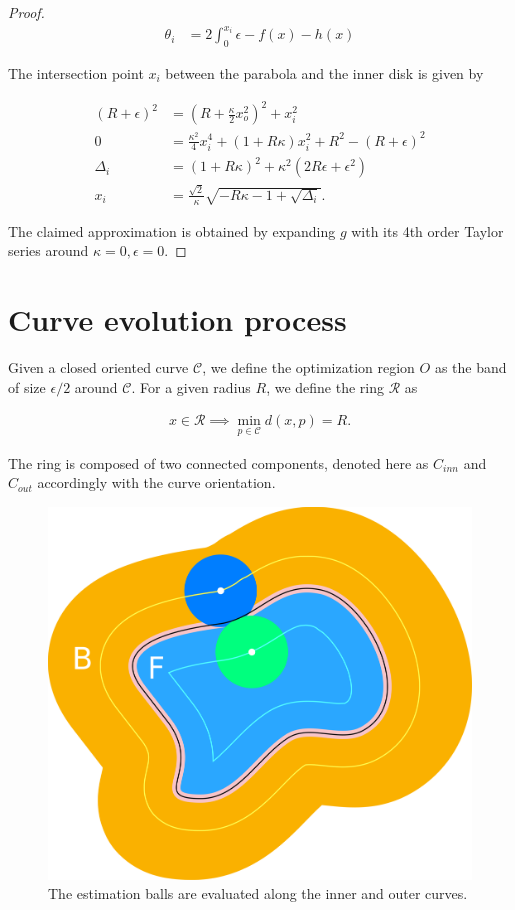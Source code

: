 \begin{proof}
\begin{align*}
	\theta_i &= 2\int_{0}^{x_i}{\epsilon - f(x) - h(x)}	\end{align*}

The intersection point $x_i$ between the parabola and the inner disk is given by
	
\begin{align*}
	(R+\epsilon)^2 &= (R+\frac{\kappa}{2}x_o^2)^2 + x_i^2\\
	0 &= \frac{\kappa^2}{4}x_i^4 + (1+R\kappa)x_i^2 + R^2 - (R+\epsilon)^2	\\
\Delta_i &= (1+R\kappa)^2 + \kappa^2(2R\epsilon + \epsilon^2)\\
x_i &= \frac{\sqrt{2}}{\kappa}\sqrt{-R\kappa-1+\sqrt{\Delta_i}}.
\end{align*}

The claimed approximation is obtained by expanding $g$ with its  4th order Taylor series around $\kappa=0,\epsilon=0$.
\end{proof}

\section{Curve evolution process}

Given a closed oriented curve $\mathcal{C}$, we define the optimization region $O$ as the band of size $\epsilon /2$ around $\mathcal{C}$. For a given radius $R$, we define the ring $\mathcal{R}$ as

\begin{align*}
	x \in \mathcal{R} \implies \min_{p \in \mathcal{C}} d(x,p) = R.
\end{align*}

The ring is composed of two connected components, denoted here as $C_{inn}$ and $C_{out}$ accordingly with the curve orientation.


\begin{figure}[h!]\label{fig:integral}
\center
\includegraphics[scale=0.25]{figures/max-energy/integral-2.png}
\caption{The estimation balls are evaluated along the inner and outer curves.}
\end{figure}


